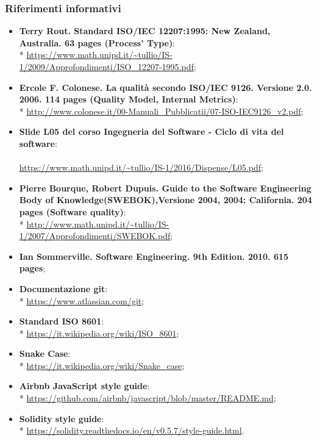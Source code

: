 \subsubsection{Riferimenti informativi}
\begin{itemize}
	\item \textbf{Terry Rout. Standard ISO/IEC 12207:1995: New Zealand, Australia. 63 pages (Process' Type)}:\\* 
	\url{https://www.math.unipd.it/~tullio/IS-1/2009/Approfondimenti/ISO_12207-1995.pdf};
	\item \textbf{Ercole F. Colonese. La qualità secondo ISO/IEC 9126. Versione 2.0. 2006. 114 pages (Quality Model, Internal Metrics)}: \\*
	\url{http://www.colonese.it/00-Manuali_Pubblicatii/07-ISO-IEC9126_v2.pdf};
	\item \textbf{Slide L05 del corso Ingegneria del Software - Ciclo di vita 
	del software}:\\ \\
		\url{https://www.math.unipd.it/~tullio/IS-1/2016/Dispense/L05.pdf};
	\item \textbf{Pierre Bourque, Robert Dupuis. Guide to the Software Engineering Body of Knowledge(SWEBOK),Versione 2004, 2004: California. 204 pages (Software quality)}: \\*
		\url{http://www.math.unipd.it/~tullio/IS-1/2007/Approfondimenti/SWEBOK.pdf};
	\item \textbf{Ian Sommerville. Software Engineering. 9th Edition. 2010. 615 pages};
	\item \textbf{Documentazione git}: \\*
		\url{https://www.atlassian.com/git};
	\item \textbf{Standard ISO 8601}: \\*
		\url{https://it.wikipedia.org/wiki/ISO_8601};
	\item \textbf{Snake Case}\glo: \\*
		\url{https://it.wikipedia.org/wiki/Snake_case};
	\item \textbf{Airbnb JavaScript style guide}: \\*
		\url{https://github.com/airbnb/javascript/blob/master/README.md};
	\item \textbf{Solidity style guide}: \\*
		\url{https://solidity.readthedocs.io/en/v0.5.7/style-guide.html}.
	
	
	
	
\end{itemize}
